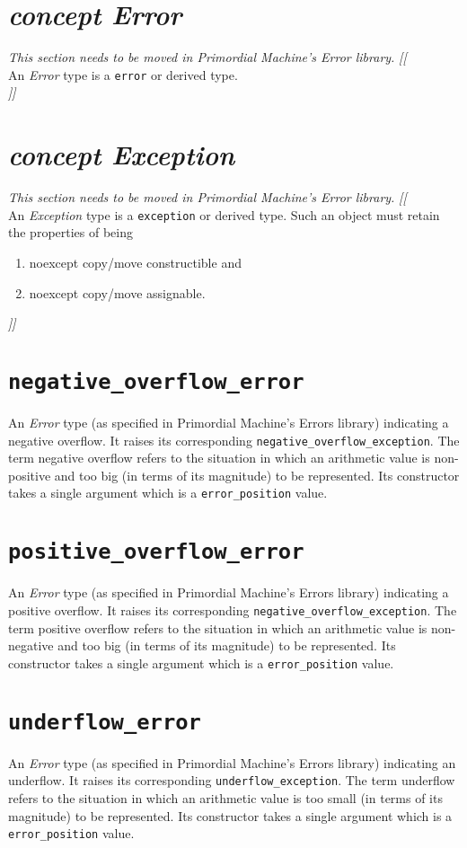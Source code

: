 \documentclass[oneside]{book}
\begin{document}
\section{\textit{concept Error}}
\textit{\color{orange}This section needs to be moved in Primordial Machine's Error library.}
\noindent\textit{\color{orange}[[}\\
An \textit{Error} type is a \texttt{error} or derived type.\\
\noindent\textit{\color{orange}]]}

\section{\textit{concept Exception}}
\textit{\color{orange}This section needs to be moved in Primordial Machine's Error library.}
\noindent\textit{\color{orange}[[}\\
An \textit{Exception} type is a \texttt{exception} or derived type.
Such an object must retain the properties of being
\begin{enumerate}
  \item noexcept copy/move constructible and
  \item noexcept copy/move assignable.
\end{enumerate}
\noindent\textit{\color{orange}]]}

\section{\texttt{negative\_overflow\_error}}
An \textit{Error} type (as specified in Primordial Machine's Errors library) indicating a negative overflow.
It raises its corresponding \texttt{negative\_overflow\_exception}.
The term negative overflow refers to the situation in which an arithmetic value is non-positive and
too big (in terms of its magnitude) to be represented. Its constructor takes a single argument which
is a \texttt{error\_position} value.

\section{\texttt{positive\_overflow\_error}}
An \textit{Error} type (as specified in Primordial Machine's Errors library) indicating a positive overflow.
It raises its corresponding \texttt{negative\_overflow\_exception}.
The term positive overflow refers to the situation in which an arithmetic value is non-negative and
too big (in terms of its magnitude) to be represented. Its constructor takes a single argument which
is a \texttt{error\_position} value.

\section{\texttt{underflow\_error}}
An \textit{Error} type (as specified in Primordial Machine's Errors library) indicating an underflow.
It raises its corresponding \texttt{underflow\_exception}.
The term underflow refers to the situation in which an arithmetic value is too small (in terms of
its magnitude) to be represented. Its constructor takes a single argument which
is a \texttt{error\_position} value.
\end{document}
